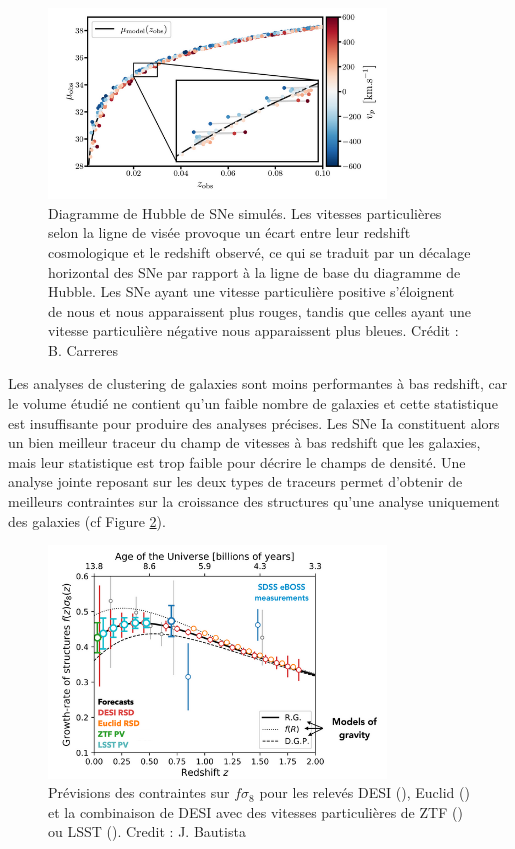 \documentclass{book}
\begin{document}
\begin{figure}[h]
    \centering
    \includegraphics[width=0.8\textwidth]{figures/Residues.png}
    \caption{Diagramme de Hubble de SNe simulés. Les vitesses particulières selon la ligne de visée provoque un écart entre leur redshift cosmologique et le redshift observé, ce qui se traduit par un décalage horizontal des SNe par rapport à la ligne de base du diagramme de Hubble. Les SNe ayant une vitesse particulière positive s'éloignent de nous et nous apparaissent plus rouges, tandis que celles ayant une vitesse particulière négative nous apparaissent plus bleues. Crédit : B. Carreres}
    \label{fig:residues}
\end{figure}

Les analyses de clustering de galaxies sont moins performantes à bas redshift, car le volume étudié ne contient qu'un faible nombre de galaxies et cette statistique est insuffisante pour produire des analyses précises. Les SNe Ia constituent alors un bien meilleur traceur du champ de vitesses à bas redshift que les galaxies, mais leur statistique est trop faible pour décrire le champs de densité. Une analyse jointe reposant sur les deux types de traceurs permet d'obtenir de meilleurs contraintes sur la croissance des structures qu'une analyse uniquement des galaxies (cf Figure \ref{fig:fs8}).

\begin{figure}[h]
    \centering
    \includegraphics[width=0.8\textwidth]{figures/fs8.png}
    \caption{Prévisions des contraintes sur $f\sigma_8$ pour les relevés DESI (\cite{hahn_desi_2023}), Euclid (\cite{euclid_collaboration_euclid_2024}) et la combinaison de DESI avec des vitesses particulières de ZTF (\cite{carreres_growth-rate_2023}) ou LSST (\cite{howlett_2mtf_2017}). Credit : J. Bautista}
    \label{fig:fs8}
\end{figure}
\end{document}
